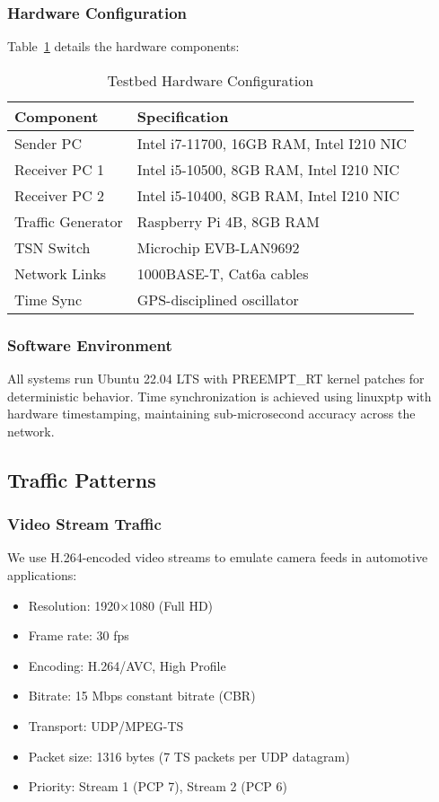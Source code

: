 \documentclass[10pt, journal, compsoc]{IEEEtran}
\begin{document}
\subsubsection{Hardware Configuration}

Table~\ref{tab:hardware_config} details the hardware components:

\begin{table}[h]
\centering
\caption{Testbed Hardware Configuration}
\label{tab:hardware_config}
\begin{tabular}{ll}
\toprule
\textbf{Component} & \textbf{Specification} \\
\midrule
Sender PC & Intel i7-11700, 16GB RAM, Intel I210 NIC \\
Receiver PC 1 & Intel i5-10500, 8GB RAM, Intel I210 NIC \\
Receiver PC 2 & Intel i5-10400, 8GB RAM, Intel I210 NIC \\
Traffic Generator & Raspberry Pi 4B, 8GB RAM \\
TSN Switch & Microchip EVB-LAN9692 \\
Network Links & 1000BASE-T, Cat6a cables \\
Time Sync & GPS-disciplined oscillator \\
\bottomrule
\end{tabular}
\end{table}

\subsubsection{Software Environment}

All systems run Ubuntu 22.04 LTS with PREEMPT\_RT kernel patches for deterministic behavior. Time synchronization is achieved using linuxptp with hardware timestamping, maintaining sub-microsecond accuracy across the network.

\subsection{Traffic Patterns}

\subsubsection{Video Stream Traffic}

We use H.264-encoded video streams to emulate camera feeds in automotive applications:

\begin{itemize}
    \item Resolution: 1920×1080 (Full HD)
    \item Frame rate: 30 fps
    \item Encoding: H.264/AVC, High Profile
    \item Bitrate: 15 Mbps constant bitrate (CBR)
    \item Transport: UDP/MPEG-TS
    \item Packet size: 1316 bytes (7 TS packets per UDP datagram)
    \item Priority: Stream 1 (PCP 7), Stream 2 (PCP 6)
\end{itemize}
\end{document}
